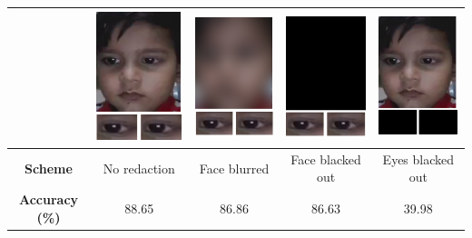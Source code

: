 \begin{table}[h]
\begin{tabular}{|c||c|c|c|c|}
         & \includegraphics[scale=0.2,valign=m]{GazePreservingRedaction/No_redaction} & \includegraphics[scale=0.2,valign=m]{GazePreservingRedaction/Face_blurred} & \includegraphics[scale=0.2,valign=m]{GazePreservingRedaction/Face_blacked} & \includegraphics[scale=0.2,valign=m]{GazePreservingRedaction/Eyes_blacked} \\
      \hline
      \textbf{Scheme} & No redaction & Face blurred & Face blacked out & Eyes blacked out \\
      \hline
      \textbf{Accuracy (\%)} & 88.65 & 86.86 & 86.63 & 39.98 \\
      \hline
    \end{tabular}  
\end{table}

